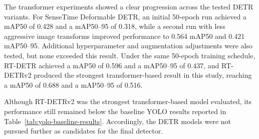 \begin{table}[!htbp]
    \centering
    \caption{Validation performance of the transformer-based detector experiments under the final 6-class formulation. All runs were trained for 50 epochs with 10 warmup epochs.}
    \label{tab:detr-results}
    \small
    \renewcommand{\arraystretch}{1.15}
\end{table}
\FloatBarrier

The transformer experiments showed a clear progression across the tested DETR 
variants. For SenseTime Deformable DETR, an initial 50-epoch run achieved a mAP50 
of 0.428 and a mAP50--95 of 0.318, while a second run with less aggressive image 
transforms improved performance to 0.564 mAP50 and 0.421 mAP50--95. Additional 
hyperparameter and augmentation adjustments were also tested, but none exceeded 
this result. Under the same 50-epoch training schedule, RT-DETR achieved a mAP50 
of 0.596 and a mAP50--95 of 0.437, and RT-DETRv2 produced the strongest transformer-based
result in this study, reaching a mAP50 of 0.688 and a mAP50--95 of 0.516.

Although RT-DETRv2 was the strongest transformer-based model evaluated, its 
performance still remained below the baseline YOLO results reported in 
Table~\ref{tab:yolo-baseline-results}. Accordingly, the DETR models were not 
pursued further as candidates for the final detector.


